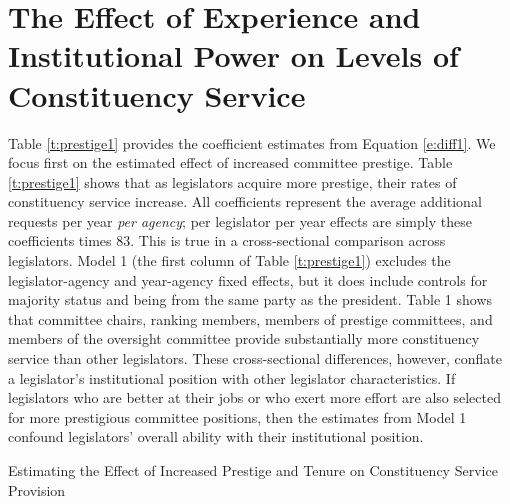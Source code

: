 \documentclass[12pt]{article}
\begin{document}
\section {The Effect of Experience and Institutional Power on Levels of Constituency Service}
Table \ref{t:prestige1} provides the coefficient estimates from Equation \ref{e:diff1}. We focus first on the estimated effect of increased committee prestige. Table \ref{t:prestige1} shows that as legislators acquire more prestige, their rates of constituency service increase. All coefficients represent the average additional requests per year \textit{per agency}; per legislator per year effects are simply these coefficients times 83. This is true in a cross-sectional comparison across legislators. Model 1 (the first column of Table \ref{t:prestige1}) excludes the legislator-agency and year-agency fixed effects, but it does include controls for majority status and being from the same party as the president. Table 1 shows that committee chairs, ranking members, members of prestige committees, and members of the oversight committee provide substantially more constituency service than other legislators. These cross-sectional differences, however, conflate a legislator's institutional position with other legislator characteristics. If legislators who are better at their jobs or who exert more effort are also selected for more prestigious committee positions, then the estimates from Model 1 confound legislators' overall ability with their institutional position.   


\begin{table}[hbt!]
\caption{Estimating the Effect of Increased Prestige and Tenure on Constituency Service Provision} \label{t:prestige1}

\begin{minipage}{\textwidth}
\begin{center}

\end{center}
\end{minipage}
\end{table}
\end{document}
